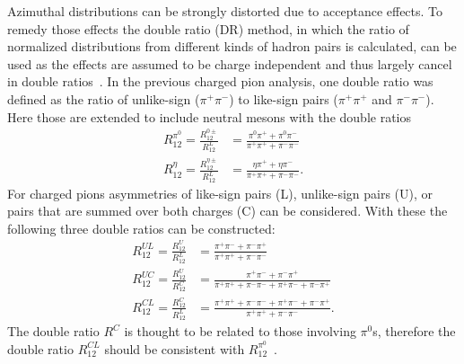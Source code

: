 \documentclass[aps,prX,preprint,groupedaddress,linenumbers]{revtex4-1}
\begin{document}
Azimuthal distributions can be strongly distorted due to acceptance effects. To remedy those effects the double ratio (DR) method, in which the ratio of normalized distributions from different kinds of hadron pairs is calculated, can be used as the effects are assumed to be charge independent and thus largely cancel in double ratios~\cite{ChargedPionResult,CollinsInSIDISandEE}. In the previous charged pion analysis, one double ratio was defined as the ratio of unlike-sign  ($\pi^+\pi^-$) to like-sign pairs ($\pi^+\pi^+$ and $\pi^-\pi^-$).
Here those are extended to include neutral mesons with the double ratios
\begin{equation}
\label{eqn:FF6}
\begin{aligned}
R_{12}^{\pi^0}=\frac{R^{0\pm}_{12}}{R^L_{12}}&=\frac{\pi^0\pi^++\pi^0\pi^-}{\pi^+\pi^++\pi^-\pi^-}\\
R_{12}^{\eta}=\frac{R^{\eta\pm}_{12}}{R^L_{12}}&=\frac{\eta\pi^++\eta\pi^-}{\pi^+\pi^++\pi^-\pi^-}.
\end{aligned}
\end{equation}
For charged pions asymmetries of like-sign pairs (L), unlike-sign pairs (U), or pairs that are summed over both charges (C) can be considered.
With these the following three double ratios can be constructed:
%
\begin{equation}
\label{eqn:FF7}
\begin{aligned}
R_{12}^{UL}=\frac{R^{U}_{12}}{R^L_{12}}&=\frac{\pi^+\pi^-+\pi^-\pi^+}{\pi^+\pi^++\pi^-\pi^-}\\
R_{12}^{UC}=\frac{R^{U}_{12}}{R^C_{12}}&=\frac{\pi^+\pi^-+\pi^-\pi^+}{\pi^+\pi^++\pi^-\pi^-+\pi^+\pi^-+\pi^-\pi^+}\\
R_{12}^{CL}=\frac{R^{C}_{12}}{R^L_{12}}&=\frac{\pi^+\pi^++\pi^-\pi^-+\pi^+\pi^-+\pi^-\pi^+}{\pi^+\pi^++\pi^-\pi^-}.
\end{aligned}
\end{equation}
%
The double ratio $R^C$ is thought to be related to those involving $\pi^0$s, therefore the double ratio $R_{12}^{CL}$ should be consistent with $R_{12}^{\pi^0}$~\cite{Efremov:2006qm}.
\end{document}
